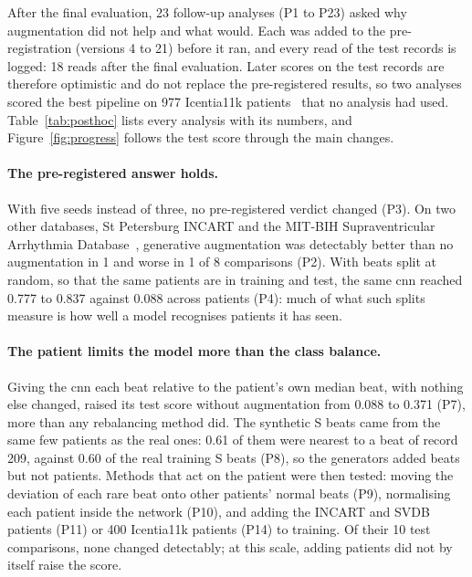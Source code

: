 After the final evaluation, 23 follow-up analyses (P1 to P23) asked why augmentation did not help and what would. Each was added to the pre-registration (versions 4 to 21) before it ran, and every read of the test records is logged: 18 reads after the final evaluation. Later scores on the test records are therefore optimistic and do not replace the pre-registered results, so two analyses scored the best pipeline on 977 Icentia11k patients~\cite{tan2022icentia} that no analysis had used. Table~\ref{tab:posthoc} lists every analysis with its numbers, and Figure~\ref{fig:progress} follows the test score through the main changes.

\paragraph{The pre-registered answer holds.} With five seeds instead of three, no pre-registered verdict changed (P3). On two other databases, St Petersburg INCART and the MIT-BIH Supraventricular Arrhythmia Database~\cite{goldberger2000}, generative augmentation was detectably better than no augmentation in 1 and worse in 1 of 8 comparisons (P2). With beats split at random, so that the same patients are in training and test, the same cnn reached 0.777 to 0.837 against 0.088 across patients (P4): much of what such splits measure is how well a model recognises patients it has seen.

\paragraph{The patient limits the model more than the class balance.} Giving the cnn each beat relative to the patient's own median beat, with nothing else changed, raised its test score without augmentation from 0.088 to 0.371 (P7), more than any rebalancing method did. The synthetic S beats came from the same few patients as the real ones: 0.61 of them were nearest to a beat of record 209, against 0.60 of the real training S beats (P8), so the generators added beats but not patients. Methods that act on the patient were then tested: moving the deviation of each rare beat onto other patients' normal beats (P9), normalising each patient inside the network (P10), and adding the INCART and SVDB patients (P11) or 400 Icentia11k patients (P14) to training. Of their 10 test comparisons, none changed detectably; at this scale, adding patients did not by itself raise the score.

